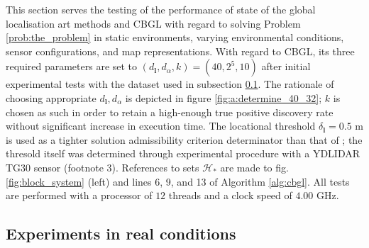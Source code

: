 This section serves the testing of the performance of state of the global
localisation art methods and CBGL with regard to solving Problem
\ref{prob:the_problem} in static environments, varying environmental
conditions, sensor configurations, and map representations. With regard to CBGL,
its three required parameters are set to $(d_{\bm{l}},d_{\alpha},k) = (40, 2^5,
10)$ after initial experimental tests with the dataset used in subsection
\ref{subsec:exp_a}. The rationale of choosing appropriate
$d_{\bm{l}},d_{\alpha}$ is depicted in figure \ref{fig:a:determine_40_32};
$k$ is chosen as such in order to retain a high-enough true positive discovery
rate without significant increase in execution time. The locational threshold
$\delta_{\bm{l}} = 0.5$ m is used as a tighter solution admissibility criterion
determinator than that of \cite{Filotheou2022g}; the thresold itself was
determined through experimental procedure with a YDLIDAR TG30 sensor (footnote
3).
References to sets $\mathcal{H}_{\ast}$ are made to fig. \ref{fig:block_system}
(left) and lines
6, 9, and 13 of Algorithm
\ref{alg:cbgl}.
All tests are performed with a processor of $12$
threads and a clock speed of $4.00$ GHz.


\subsection{Experiments in real conditions}
\label{subsec:exp_a}

